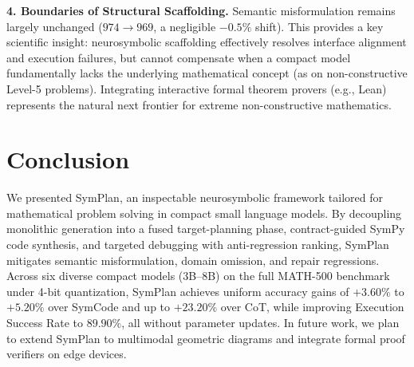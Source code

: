 \documentclass[conference,a4paper]{IEEEtran}
\begin{document}
\textbf{4. Boundaries of Structural Scaffolding.} Semantic misformulation remains largely unchanged ($974 \to 969$, a negligible $-0.5\%$ shift). This provides a key scientific insight: neurosymbolic scaffolding effectively resolves interface alignment and execution failures, but cannot compensate when a compact model fundamentally lacks the underlying mathematical concept (as on non-constructive Level-5 problems). Integrating interactive formal theorem provers (e.g., Lean) represents the natural next frontier for extreme non-constructive mathematics.

\section{Conclusion}

We presented SymPlan, an inspectable neurosymbolic framework tailored for mathematical problem solving in compact small language models. By decoupling monolithic generation into a fused target-planning phase, contract-guided SymPy code synthesis, and targeted debugging with anti-regression ranking, SymPlan mitigates semantic misformulation, domain omission, and repair regressions. Across six diverse compact models (3B--8B) on the full MATH-500 benchmark under 4-bit quantization, SymPlan achieves uniform accuracy gains of $+3.60\%$ to $+5.20\%$ over SymCode and up to $+23.20\%$ over CoT, while improving Execution Success Rate to $89.90\%$, all without parameter updates. In future work, we plan to extend SymPlan to multimodal geometric diagrams and integrate formal proof verifiers on edge devices.



\end{document}
